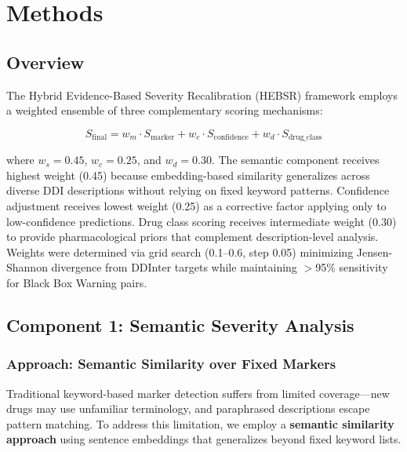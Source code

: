 \documentclass[11pt,a4paper]{article}
\newcommand{\method}{Hybrid Evidence-Based Severity Recalibration}
\begin{document}
\section{Methods}

\subsection{Overview}

The \method{} (HEBSR) framework employs a weighted ensemble of three complementary scoring mechanisms:

\begin{equation}
S_{\text{final}} = w_m \cdot S_{\text{marker}} + w_c \cdot S_{\text{confidence}} + w_d \cdot S_{\text{drug\_class}}
\label{eq:hybrid_score}
\end{equation}

where $w_s = 0.45$, $w_c = 0.25$, and $w_d = 0.30$. The semantic component receives highest weight (0.45) because embedding-based similarity generalizes across diverse DDI descriptions without relying on fixed keyword patterns. Confidence adjustment receives lowest weight (0.25) as a corrective factor applying only to low-confidence predictions. Drug class scoring receives intermediate weight (0.30) to provide pharmacological priors that complement description-level analysis. Weights were determined via grid search (0.1--0.6, step 0.05) minimizing Jensen-Shannon divergence from DDInter targets while maintaining $>$95\% sensitivity for Black Box Warning pairs.

\subsection{Component 1: Semantic Severity Analysis}

\subsubsection{Approach: Semantic Similarity over Fixed Markers}

Traditional keyword-based marker detection suffers from limited coverage---new drugs may use unfamiliar terminology, and paraphrased descriptions escape pattern matching. To address this limitation, we employ a \textbf{semantic similarity approach} using sentence embeddings that generalizes beyond fixed keyword lists.
\end{document}
